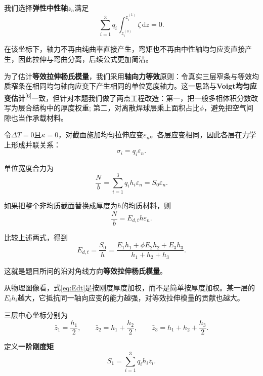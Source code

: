 \documentclass[draft,12pt,a4paper]{ctexart}
\theoremstyle{definition}
\newcommand{\diff}{\mathrm{d}}
\begin{document}
我们选择\textbf{弹性中性轴}$z_n$满足
\begin{equation}\label{eq:neutral}
\sum_{i=1}^{3}q_i\int_{z_i^{(0)}}^{z_i^{(1)}}\zeta\,\diff z=0.
\end{equation}

在该坐标下，轴力不再由纯曲率直接产生，弯矩也不再由中性轴均匀应变直接产生，因此拉伸与弯曲分离，后续公式更加简洁。


为了估计\textbf{等效拉伸杨氏模量}，我们采用\textbf{轴向力等效}原则：令真实三层窄条与等效均质窄条在相同均匀轴向应变下产生相同的单位宽度轴力。这一思路与\textbf{Voigt均匀应变估计}\textsuperscript{[6]}一致，但针对本题我们做了两点工程改造：第一，把一般多相体积分数改写为层合结构中的厚度权重; 第二，对离散焊球层乘上面积占比$\phi$，避免把空气间隙也当作承载材料。

令$\Delta T=0$且$\kappa=0$，对截面施加均匀拉伸应变$\varepsilon_n$。各层应变相同，因此各层在力学上形成并联关系：
\begin{equation}
\sigma_i=q_i\varepsilon_n.
\end{equation}

单位宽度合力为
\begin{equation}
\frac{N}{b}=\sum_{i=1}^{3}q_i h_i\varepsilon_n=S_0\varepsilon_n.
\end{equation}

如果把整个非均质截面替换成厚度为$h$的均质材料，则
\begin{equation}
\frac{N}{b}=E_{d,t}h\varepsilon_n.
\end{equation}

比较上述两式，得到
\begin{equation}\label{eq:Edt}
E_{d,t}=\frac{S_0}{h}
=\frac{E_1 h_1+\phi E_2 h_2+E_3 h_3}{h_1+h_2+h_3}.
\end{equation}

这就是题目所问的沿对角线方向\textbf{等效拉伸杨氏模量}。

从物理图像看，式\eqref{eq:Edt}是按刚度厚度加权，而不是简单按厚度加权。某一层的$E_i h_i$越大，它抵抗同一轴向应变的能力越强，对等效拉伸模量的贡献也越大。


三层中心坐标分别为
\begin{equation}\label{eq:zbar}
\bar{z}_1=\frac{h_1}{2},\qquad
\bar{z}_2=h_1+\frac{h_2}{2},\qquad
\bar{z}_3=h_1+h_2+\frac{h_3}{2}.
\end{equation}

定义\textbf{一阶刚度矩}
\begin{equation}\label{eq:S1}
S_1=\sum_{i=1}^{3}q_i h_i\bar{z}_i.
\end{equation}
\end{document}
